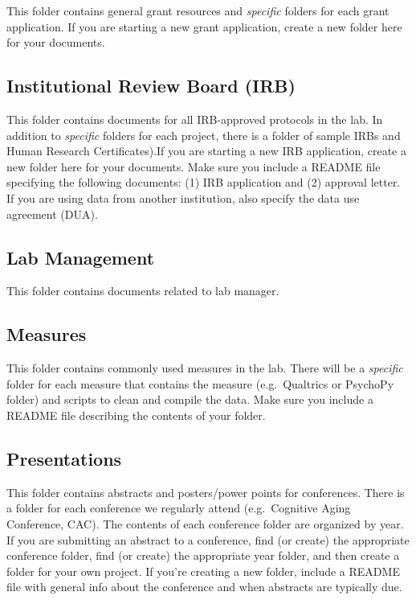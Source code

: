 \documentclass[]{book}
\begin{document}
This folder contains general grant resources and \emph{specific} folders for each grant application. If you are starting a new grant application, create a new folder here for your documents.

\hypertarget{institutional-review-board-irb}{%
\subsection{Institutional Review Board (IRB)}\label{institutional-review-board-irb}}

This folder contains documents for all IRB-approved protocols in the lab. In addition to \emph{specific} folders for each project, there is a folder of sample IRBs and Human Research Certificates).If you are starting a new IRB application, create a new folder here for your documents. Make sure you include a README file specifying the following documents: (1) IRB application and (2) approval letter. If you are using data from another institution, also specify the data use agreement (DUA).

\hypertarget{lab-management}{%
\subsection{Lab Management}\label{lab-management}}

This folder contains documents related to lab manager.

\hypertarget{measures}{%
\subsection{Measures}\label{measures}}

This folder contains commonly used measures in the lab. There will be a \emph{specific} folder for each measure that contains the measure (e.g.~Qualtrics or PsychoPy folder) and scripts to clean and compile the data. Make sure you include a README file describing the contents of your folder.

\hypertarget{presentations}{%
\subsection{Presentations}\label{presentations}}

This folder contains abstracts and posters/power points for conferences. There is a folder for each conference we regularly attend (e.g.~Cognitive Aging Conference, CAC). The contents of each conference folder are organized by year. If you are submitting an abstract to a conference, find (or create) the appropriate conference folder, find (or create) the appropriate year folder, and then create a folder for your own project. If you're creating a new folder, include a README file with general info about the conference and when abstracts are typically due.
\end{document}
